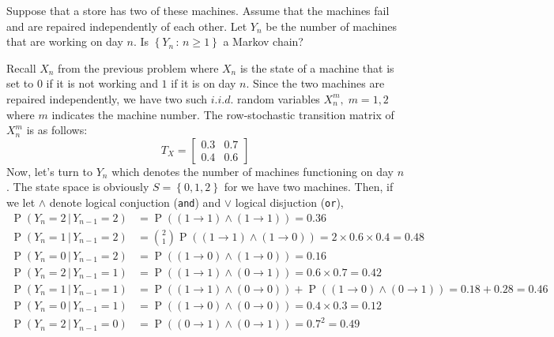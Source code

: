 \documentclass[answers]{exam}
\DeclareMathOperator{\Prob}{P}
\begin{document}
\newpage
{}
\begin{questions}
  \question
  Suppose that a store has two of these machines. Assume that the machines fail and are repaired independently of each other. Let $Y_{n}$ be the number of machines that are working on day $n$. Is $\left\{Y_{n}\,:\, n\geq 1 \right\}$ a Markov chain?
  \begin{solution}
    Recall $X_{n}$ from the previous problem where $X_{n}$ is the state of a machine that is set to $0$ if it is not working and $1$ if it is on day $n$. Since the two machines are repaired independently, we have two such $i.i.d.$ random variables $X_{n}^{m},\; m=1,2$ where $m$ indicates the machine number. The row-stochastic transition matrix of $X_{n}^{m}$ is as follows:
    \begin{equation}
        T_{X} = \begin{bmatrix} 0.3  & 0.7\\ 0.4 & 0.6 \end{bmatrix}
    \end{equation}
    Now, let's turn to $Y_{n}$ which denotes the number of machines functioning on day $n$. The state space is obviously $S = \left\{0,1,2\right\}$ for we have two machines. Then, if we let $\wedge$ denote logical conjuction (\texttt{and}) and $\vee$ logical disjuction (\texttt{or}),
    \begin{align}
        \Prob(Y_{n}=2\,|\,Y_{n-1}=2) &= \Prob((1\to 1)\wedge (1\to1)) = 0.36\\
        \Prob(Y_{n}=1\,|\,Y_{n-1}=2) &= \binom{2}{1}\Prob((1\to1)\wedge (1\to0)) = 2\times 0.6\times 0.4 = 0.48\\
        \Prob(Y_{n}=0\,|\,Y_{n-1}=2) &= \Prob((1\to0)\wedge (1\to0)) = 0.16\\
        \Prob(Y_{n}=2\,|\, Y_{n-1}=1) &= \Prob((1\to1)\wedge(0\to1)) = 0.6\times0.7 = 0.42\\
        \Prob(Y_{n}=1\,|\,Y_{n-1}=1) &= \Prob((1\to1)\wedge (0\to 0))+\Prob((1\to0)\wedge (0\to1)) = 0.18+0.28 = 0.46\\
        \Prob(Y_{n}=0\,|\,Y_{n-1}=1) &= \Prob((1\to0)\wedge(0\to0)) = 0.4\times 0.3 = 0.12\\
        \Prob(Y_{n}=2\,|\,Y_{n-1}=0) &= \Prob((0\to1)\wedge(0\to1)) = 0.7^{2} = 0.49\\

\end{align}
\end{solution}
\end{questions}
\end{document}
